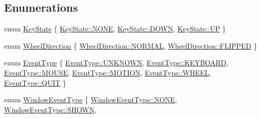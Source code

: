 \subsection*{Enumerations}
\begin{DoxyCompactItemize}
\item 
enum \hyperlink{namespacebkengine_a98437a3b234dfae2c61231b4737d0834}{Key\+State} \{ \hyperlink{namespacebkengine_a98437a3b234dfae2c61231b4737d0834ab50339a10e1de285ac99d4c3990b8693}{Key\+State\+::\+N\+O\+NE}, 
\hyperlink{namespacebkengine_a98437a3b234dfae2c61231b4737d0834ac4e0e4e3118472beeb2ae75827450f1f}{Key\+State\+::\+D\+O\+WN}, 
\hyperlink{namespacebkengine_a98437a3b234dfae2c61231b4737d0834afbaedde498cdead4f2780217646e9ba1}{Key\+State\+::\+UP}
 \}
\item 
enum \hyperlink{namespacebkengine_aa44114d68464e64c59b6fceae1084af6}{Wheel\+Direction} \{ \hyperlink{namespacebkengine_aa44114d68464e64c59b6fceae1084af6a1e23852820b9154316c7c06e2b7ba051}{Wheel\+Direction\+::\+N\+O\+R\+M\+AL}, 
\hyperlink{namespacebkengine_aa44114d68464e64c59b6fceae1084af6aa6629f68b0278b6b5f4f07dd674bc5fb}{Wheel\+Direction\+::\+F\+L\+I\+P\+P\+ED}
 \}
\item 
enum \hyperlink{namespacebkengine_a3e5e03aeca2071b818e61f66670f6056}{Event\+Type} \{ \newline
\hyperlink{namespacebkengine_a3e5e03aeca2071b818e61f66670f6056a696b031073e74bf2cb98e5ef201d4aa3}{Event\+Type\+::\+U\+N\+K\+N\+O\+WN}, 
\hyperlink{namespacebkengine_a3e5e03aeca2071b818e61f66670f6056aedda266cdb6345b9f6914cc2e7577475}{Event\+Type\+::\+K\+E\+Y\+B\+O\+A\+RD}, 
\hyperlink{namespacebkengine_a3e5e03aeca2071b818e61f66670f6056a2ec2be318cc86a1224c0e9dcc71321e4}{Event\+Type\+::\+M\+O\+U\+SE}, 
\hyperlink{namespacebkengine_a3e5e03aeca2071b818e61f66670f6056af96e6ea7a7375bd60bad3f3caae3cf27}{Event\+Type\+::\+M\+O\+T\+I\+ON}, 
\newline
\hyperlink{namespacebkengine_a3e5e03aeca2071b818e61f66670f6056a0f0dd2bcb848ba94248d660bada66b34}{Event\+Type\+::\+W\+H\+E\+EL}, 
\hyperlink{namespacebkengine_a3e5e03aeca2071b818e61f66670f6056a5dfd352dd6b7a5d118237fcf1e19fcc1}{Event\+Type\+::\+Q\+U\+IT}
 \}
\item 
enum \hyperlink{namespacebkengine_a9a2b91b816d91057aca0de0b6e471b3e}{Window\+Event\+Type} \{ \newline
\hyperlink{namespacebkengine_a9a2b91b816d91057aca0de0b6e471b3eab50339a10e1de285ac99d4c3990b8693}{Window\+Event\+Type\+::\+N\+O\+NE}, 
\hyperlink{namespacebkengine_a9a2b91b816d91057aca0de0b6e471b3ea964ee5bf12d775d179554a8c12f752ae}{Window\+Event\+Type\+::\+S\+H\+O\+WN}, 

\end{DoxyCompactItemize}
